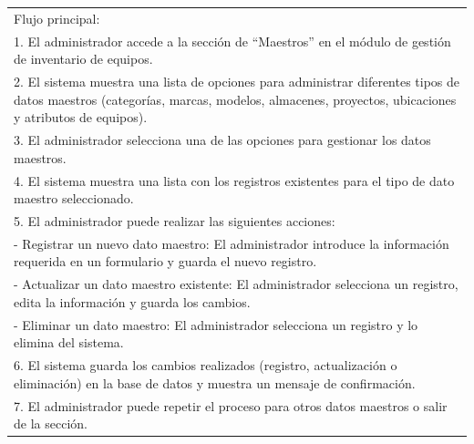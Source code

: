 \documentclass[stu, 12pt, letterpaper, donotrepeattitle, floatsintext, natbib]{apa7}
\begin{document}
\begin{longtable}{@{} p{16.5cm} @{}}
    Flujo principal:                                                                                                                                                                         \\
    1. El administrador accede a la sección de ``Maestros'' en el módulo de gestión de inventario de equipos.                                                                                \\
    2. El sistema muestra una lista de opciones para administrar diferentes tipos de datos maestros (categorías, marcas, modelos, almacenes, proyectos, ubicaciones y atributos de equipos). \\
    3. El administrador selecciona una de las opciones para gestionar los datos maestros.                                                                                                    \\
    4. El sistema muestra una lista con los registros existentes para el tipo de dato maestro seleccionado.                                                                                  \\
    5. El administrador puede realizar las siguientes acciones:                                                                                                                              \\
    \hspace{1cm}- Registrar un nuevo dato maestro: El administrador introduce la información requerida en un formulario y guarda el nuevo registro.                                          \\
    \hspace{1cm}- Actualizar un dato maestro existente: El administrador selecciona un registro, edita la información y guarda los cambios.                                                  \\
    \hspace{1cm}- Eliminar un dato maestro: El administrador selecciona un registro y lo elimina del sistema.                                                                                \\
    6. El sistema guarda los cambios realizados (registro, actualización o eliminación) en la base de datos y muestra un mensaje de confirmación.                                            \\
    7. El administrador puede repetir el proceso para otros datos maestros o salir de la sección.                                                                                            \\ \midrule

\end{longtable}
\end{document}
